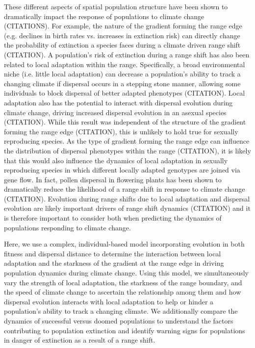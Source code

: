 \documentclass[11pt, oneside]{article}
\begin{document}
These different aspects of spatial population structure have been shown to dramatically impact the response of populations to climate change (CITATIONS). For example, the nature of the gradient forming the range edge (e.g. declines in birth rates vs. increases in extinction risk) can directly change the probability of extinction a species faces during a climate driven range shift (CITATION). A population's risk of extinction during a range shift has also been related to local adaptation within the range. Specifically, a broad environmental niche (i.e. little local adaptation) can decrease a population's ability to track a changing climate if dispersal occurs in a stepping stone manner, allowing some individuals to block dispersal of better adapted phenotypes (CITATION). Local adaptation also has the potential to interact with dispersal evolution during climate change, driving increased dispersal evolution in an asexual species (CITATION). While this result was independent of the structure of the gradient forming the range edge (CITATION), this is unlikely to hold true for sexually reproducing species. As the type of gradient forming the range edge can influence the distribution of dispersal phenotypes within the range (CITATION), it is likely that this would also influence the dynamics of local adaptation in sexually reproducing species in which different locally adapted genotypes are joined via gene flow. In fact, pollen dispersal in flowering plants has been shown to dramatically reduce the likelihood of a range shift in response to climate change (CITATION). Evolution during range shifts due to local adaptation and dispersal evolution are likely important drivers of range shift dynamics (CITATION) and it is therefore important to consider both when predicting the dynamics of populations responding to climate change.


Here, we use a complex, individual-based model incorporating evolution in both fitness and dispersal distance to determine the interaction between local adaptation and the starkness of the gradient at the range edge in driving population dynamics during climate change. Using this model, we simultaneously vary the strength of local adaptation, the starkness of the range boundary, and the speed of climate change to ascertain the relationship among them and how dispersal evolution interacts with local adaptation to help or hinder a population's ability to track a changing climate. We additionally compare the dynamics of successful versus doomed populations to understand the factors contributing to population extinction and identify warning signs for populations in danger of extinction as a result of a range shift.
\end{document}
